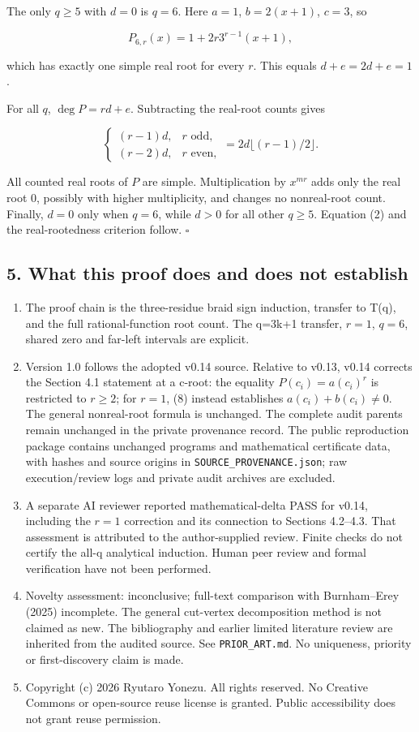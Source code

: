 \documentclass[
  10pt,
]{article}
\providecommand{\tightlist}{%
  \setlength{\itemsep}{0pt}\setlength{\parskip}{0pt}}
\begin{document}
The only \(q\ge5\) with \(d=0\) is \(q=6\). Here \(a=1\), \(b=2(x+1)\),
\(c=3\), so

\[
 P_{6,r}(x)=1+2r3^{r-1}(x+1),
\]

which has exactly one simple real root for every \(r\). This equals
\(d+e=2d+e=1\).

For all \(q\), \(\deg P=rd+e\). Subtracting the real-root counts gives

\[
 \begin{cases}
 (r-1)d,&r\text{ odd},\\
 (r-2)d,&r\text{ even},
 \end{cases}
 =2d\lfloor(r-1)/2\rfloor.
\]

All counted real roots of \(P\) are simple. Multiplication by \(x^{mr}\)
adds only the real root \(0\), possibly with higher multiplicity, and
changes no nonreal-root count. Finally, \(d=0\) only when \(q=6\), while
\(d>0\) for all other \(q\ge5\). Equation (2) and the real-rootedness
criterion follow. \(\square\)

\subsection{5. What this proof does and does not establish}\label{what-this-proof-does-and-does-not-establish}
\begin{enumerate}
\tightlist
\item The proof chain is the three-residue braid sign induction, transfer to T(q), and the full rational-function root count. The q=3k+1 transfer, \(r=1\), \(q=6\), shared zero and far-left intervals are explicit.
\item Version 1.0 follows the adopted v0.14 source. Relative to v0.13, v0.14 corrects the Section 4.1 statement at a c-root: the equality \(P(c_i)=a(c_i)^r\) is restricted to \(r\ge2\); for \(r=1\), (8) instead establishes \(a(c_i)+b(c_i)\ne0\). The general nonreal-root formula is unchanged. The complete audit parents remain unchanged in the private provenance record. The public reproduction package contains unchanged programs and mathematical certificate data, with hashes and source origins in \texttt{SOURCE\_PROVENANCE.json}; raw execution/review logs and private audit archives are excluded.
\item A separate AI reviewer reported mathematical-delta PASS for v0.14, including the \(r=1\) correction and its connection to Sections 4.2--4.3. That assessment is attributed to the author-supplied review. Finite checks do not certify the all-q analytical induction. Human peer review and formal verification have not been performed.
\item Novelty assessment: inconclusive; full-text comparison with Burnham--Erey (2025) incomplete. The general cut-vertex decomposition method is not claimed as new. The bibliography and earlier limited literature review are inherited from the audited source. See \texttt{PRIOR\_ART.md}. No uniqueness, priority or first-discovery claim is made.
\item Copyright (c) 2026 Ryutaro Yonezu. All rights reserved. No Creative Commons or open-source reuse license is granted. Public accessibility does not grant reuse permission.
\end{enumerate}
\end{document}
